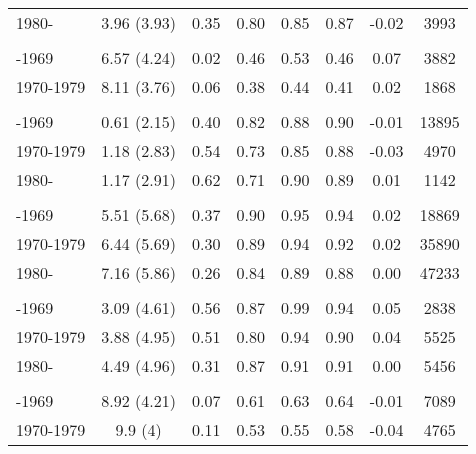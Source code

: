 \begin{ThreePartTable}
\begin{longtable}[t]{lccccccc}
\hspace{1em}1980- & 3.96 (3.93) & 0.35 & 0.80 & 0.85 & 0.87 & -0.02 & 3993\\
\addlinespace[0.3em]
\multicolumn{8}{l}{\textbf{Namibia}}\\
\hspace{1em}-1969 & 6.57 (4.24) & 0.02 & 0.46 & 0.53 & 0.46 & 0.07 & 3882\\
\hspace{1em}1970-1979 & 8.11 (3.76) & 0.06 & 0.38 & 0.44 & 0.41 & 0.02 & 1868\\
\addlinespace[0.3em]
\multicolumn{8}{l}{\textbf{Niger}}\\
\hspace{1em}-1969 & 0.61 (2.15) & 0.40 & 0.82 & 0.88 & 0.90 & -0.01 & 13895\\
\hspace{1em}1970-1979 & 1.18 (2.83) & 0.54 & 0.73 & 0.85 & 0.88 & -0.03 & 4970\\
\hspace{1em}1980- & 1.17 (2.91) & 0.62 & 0.71 & 0.90 & 0.89 & 0.01 & 1142\\
\addlinespace[0.3em]
\multicolumn{8}{l}{\textbf{Nigeria}}\\
\hspace{1em}-1969 & 5.51 (5.68) & 0.37 & 0.90 & 0.95 & 0.94 & 0.02 & 18869\\
\hspace{1em}1970-1979 & 6.44 (5.69) & 0.30 & 0.89 & 0.94 & 0.92 & 0.02 & 35890\\
\hspace{1em}1980- & 7.16 (5.86) & 0.26 & 0.84 & 0.89 & 0.88 & 0.00 & 47233\\
\addlinespace[0.3em]
\multicolumn{8}{l}{\textbf{Pakistan}}\\
\hspace{1em}-1969 & 3.09 (4.61) & 0.56 & 0.87 & 0.99 & 0.94 & 0.05 & 2838\\
\hspace{1em}1970-1979 & 3.88 (4.95) & 0.51 & 0.80 & 0.94 & 0.90 & 0.04 & 5525\\
\hspace{1em}1980- & 4.49 (4.96) & 0.31 & 0.87 & 0.91 & 0.91 & 0.00 & 5456\\
\addlinespace[0.3em]
\multicolumn{8}{l}{\textbf{Philippines}}\\
\hspace{1em}-1969 & 8.92 (4.21) & 0.07 & 0.61 & 0.63 & 0.64 & -0.01 & 7089\\
\hspace{1em}1970-1979 & 9.9 (4) & 0.11 & 0.53 & 0.55 & 0.58 & -0.04 & 4765\\

\end{longtable}
\end{ThreePartTable}
